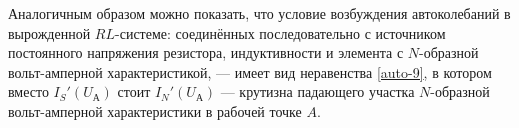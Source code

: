 Аналогичным образом можно показать, что условие возбуждения автоколебаний 
в вырожденной $RL$-системе: соединённых последовательно с источником постоянного 
напряжения резистора, индуктивности и элемента с $N$-образной вольт-амперной 
характеристикой, --- имеет вид неравенства \eqref{auto-9}, 
в котором вместо $I_S'\left(U_{А}\right)$ стоит $I_N'\left(U_{А}\right)$ --- 
крутизна падающего  участка $N$-образной вольт-амперной характеристики 
в рабочей точке $A$.

